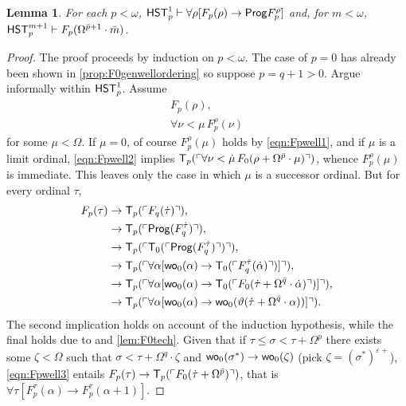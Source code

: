 \documentclass[UKenglish,cleveref,DIV=12]{scrartcl}
\newtheorem{lemma}[theorem]{Lemma}%
\theoremstyle{definition}
\theoremstyle{definition}
\newcommand{\gelnote}[1]{\note[magenta]{#1}}
\begin{document}
\begin{lemma}\label{lem:Fpwellordering1}
 For each $p<\omega$, $\mathsf{HST}_p^1\vdash \forall\rho[F_p(\rho)\rightarrow\mathsf{Prog} F_p^{\rho}]$ and, for $m<\omega$,  $\mathsf{HST}_p^{m+1}\vdash F_p(\Omega^{\bar p+1}\cdot\bar m)$.
\end{lemma}
\begin{proof} The proof proceeds by induction on $p<\omega$. The case of $p=0$
has already been shown in \cref{prop:F0genwellordering} so suppose $p=q+1>0$.
Argue informally within $\mathsf{HST}_p^1$. Assume
\begin{gather}
 F_p(\rho),\label{eqn:Fpwell1}\\
 \forall\nu<\mu\,F_p^\rho(\nu)\label{eqn:Fpwell2}
\end{gather}
for some $\mu<\Omega$. If $\mu=0$, of course $F_p^\rho(\mu)$ holds by
\eqref{eqn:Fpwell1}, and if $\mu$ is a limit ordinal, \eqref{eqn:Fpwell2}
implies $\mathsf{T}_p(\ulcorner{\forall\nu<\dot\mu\,F_0(\rho+\Omega^{\bar p}\cdot\mu)}\urcorner)$,
whence $F_p^\rho(\mu)$ is immediate. This leaves only the case in which $\mu$ is a
successor ordinal. But for every ordinal $\tau$,
\begin{align}\label{eqn:Fpwell3}
\begin{split}
  F_p(\tau) &\rightarrow \mathsf{T}_p(\ulcorner{F_q(\dot\tau)}\urcorner), \\
	  &\rightarrow \mathsf{T}_p(\ulcorner{\mathsf{Prog}(F_q^{\dot\tau})}\urcorner),\\
	  &\rightarrow \mathsf{T}_p(\ulcorner{\mathsf{T}_0(\ulcorner{\mathsf{Prog}(F_q^{\dot\tau})}\urcorner)}\urcorner),\\
	  &\rightarrow \mathsf{T}_p(\ulcorner{\forall\alpha[\mathsf{wo}_0(\alpha)\rightarrow \mathsf{T}_0(\ulcorner{F_q^{\dot\tau}(\dot\alpha)}\urcorner)]}\urcorner),\\
	  &\rightarrow \mathsf{T}_p(\ulcorner{\forall\alpha[\mathsf{wo}_0(\alpha)\rightarrow \mathsf{T}_0(\ulcorner{F_0(\dot\tau+\Omega^{\bar q}\cdot\dot\alpha)}\urcorner)]}\urcorner),\\
	  &\rightarrow \mathsf{T}_p(\ulcorner{\forall\alpha[\mathsf{wo}_0(\alpha)\rightarrow\mathsf{wo}_0(\vartheta(\dot\tau+\Omega^{\bar q}\cdot\alpha))]}\urcorner).
	  \end{split}
\end{align}
The second implication holds on account of the induction hypothesis, while the
final holds due to  and \cref{lem:F0tech}. Given that if
$\tau\le\sigma<\tau+\Omega^{p}$ there exists
some $\zeta<\Omega$ such that $\sigma<\tau+\Omega^q\cdot\zeta$ and
$\mathsf{wo}_0(\sigma^*)\rightarrow\mathsf{wo}_0(\zeta)$ (pick
$\zeta=(\sigma^*)^{\varepsilon+}$), \eqref{eqn:Fpwell3}     %
entails $F_p(\tau)\rightarrow\mathsf{T}_p(\ulcorner{F_0(\dot\tau+\Omega^{\bar p})}\urcorner)$,
that is $\forall\tau[F_p^\tau(\alpha)\rightarrow F_p^\tau(\alpha+1)]$.


\end{proof}
\end{document}
